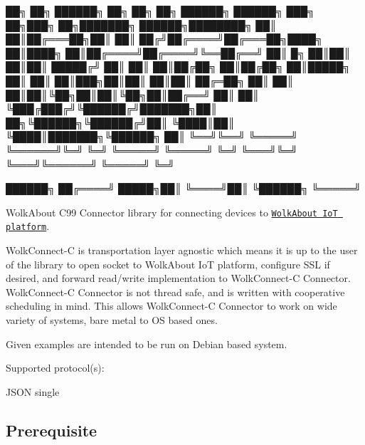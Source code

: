 
\begin{DoxyCode}
██╗    ██╗ ██████╗ ██╗     ██╗  ██╗ ██████╗ ██████╗ ███╗   ██╗███╗   ██╗███████╗ ██████╗████████╗  
██║    ██║██╔═══██╗██║     ██║ ██╔╝██╔════╝██╔═══██╗████╗  ██║████╗  ██║██╔════╝██╔════╝╚══██╔══╝  
██║ █╗ ██║██║   ██║██║     █████╔╝ ██║     ██║   ██║██╔██╗ ██║██╔██╗ ██║█████╗  ██║        ██║     
██║███╗██║██║   ██║██║     ██╔═██╗ ██║     ██║   ██║██║╚██╗██║██║╚██╗██║██╔══╝  ██║        ██║     
╚███╔███╔╝╚██████╔╝███████╗██║  ██╗╚██████╗╚██████╔╝██║ ╚████║██║ ╚████║███████╗╚██████╗   ██║     
 ╚══╝╚══╝  ╚═════╝ ╚══════╝╚═╝  ╚═╝ ╚═════╝ ╚═════╝ ╚═╝  ╚═══╝╚═╝  ╚═══╝╚══════╝ ╚═════╝   ╚═╝     

                                                                                            ██████╗
                                                                                           ██╔════╝
                                                                                     █████╗██║     
                                                                                     ╚════╝██║     
                                                                                           ╚██████╗
                                                                                            ╚═════╝
\end{DoxyCode}


 Wolk\+About C99 Connector library for connecting devices to \href{https://demo.wolkabout.com/#/login}{\tt Wolk\+About IoT platform}.

Wolk\+Connect-\/C is transportation layer agnostic which means it is up to the user of the library to open socket to Wolk\+About IoT platform, configure S\+SL if desired, and forward read/write implementation to Wolk\+Connect-\/C Connector. Wolk\+Connect-\/C Connector is not thread safe, and is written with cooperative scheduling in mind. This allows Wolk\+Connect-\/C Connector to work on wide variety of systems, bare metal to OS based ones.

Given examples are intended to be run on Debian based system.

Supported protocol(s)\+:
\begin{DoxyItemize}
\item J\+S\+ON single
\end{DoxyItemize}

\subsection*{Prerequisite }

